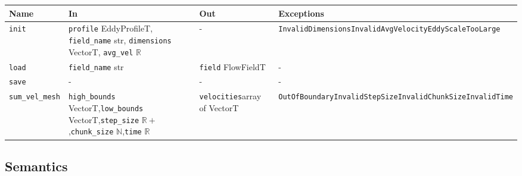\documentclass[12pt, titlepage]{article}
\begin{document}
\begin{center}
\begin{tabular}{p{2.3cm} p{4.3cm} p{3.5cm} p{4cm}}
\hline
\textbf{Name} & \textbf{In} & \textbf{Out} & \textbf{Exceptions} \\
\hline
\texttt{init} & \texttt{profile} EddyProfileT, \newline\texttt{field\_name} str, \newline\texttt{dimensions} VectorT, \newline\texttt{avg\_vel} $\mathbb{R}$ & - & \texttt{InvalidDimensions}\newline\texttt{InvalidAvgVelocity}\newline\texttt{EddyScaleTooLarge}\\
\texttt{load} & \texttt{field\_name} str & \texttt{field} FlowFieldT & -  \\
\texttt{save} & - & - & -  \\
\texttt{sum\_vel\_mesh}& \texttt{high\_bounds} VectorT,\newline\texttt{low\_bounds} VectorT,\newline\texttt{step\_size} $\mathbb{R+}$,\newline\texttt{chunk\_size} $\mathbb{N}$,\newline\texttt{time} $\mathbb{R}$ & \texttt{velocities}\newline array of VectorT & \texttt{OutOfBoundary}\newline\texttt{InvalidStepSize}\newline\texttt{InvalidChunkSize}\newline\texttt{InvalidTime} \\
\hline
\end{tabular}
\end{center}

\subsection{Semantics}
\end{document}
